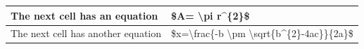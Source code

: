 \documentclass[11pt,a4paper]{article}
\begin{document}
\begin{table}[h]
\begin{tabular}{|l|l|}
\hline
The next cell has an equation & \$A= \textbackslash{}pi r\textasciicircum{}\{2\}\$ \\ \hline
The next cell has another equation & \$x=\textbackslash{}frac\{-b \textbackslash{}pm \textbackslash{}sqrt\{b\textasciicircum{}\{2\}-4ac\}\}\{2a\}\$ \\ \hline
\end{tabular}
\end{table}
\end{document}
